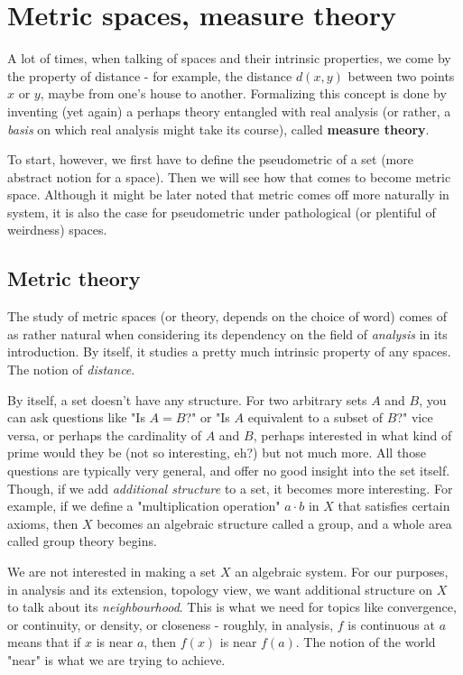 \chapter{Metric spaces, measure theory}

A lot of times, when talking of spaces and their intrinsic properties, we come by the property of distance - for example, the distance $d(x,y)$ between two points $x$ or $y$, maybe from one's house to another. Formalizing this concept is done by inventing (yet again) a perhaps theory entangled with real analysis (or rather, a \textit{basis} on which real analysis might take its course), called \textbf{measure theory}. 

To start, however, we first have to define the pseudometric of a set (more abstract notion for a space). Then we will see how that comes to become metric space. Although it might be later noted that metric comes off more naturally in system, it is also the case for pseudometric under pathological (or plentiful of weirdness) spaces. 

\section{Metric theory}

The study of metric spaces (or theory, depends on the choice of word) comes of as rather natural when considering its dependency on the field of \textit{analysis} in its introduction. By itself, it studies a pretty much intrinsic property of any spaces. The notion of \textit{distance}. 

By itself, a set doesn't have any structure. For two arbitrary sets $A$ and $B$, you can ask questions like "Is $A=B$?" or "Is $A$ equivalent to a subset of $B$?" vice versa, or perhaps the cardinality of $A$ and $B$, perhaps interested in what kind of prime would they be (not so interesting, eh?) but not much more. All those questions are typically very general, and offer no good insight into the set itself. Though, if we add \textit{additional structure} to a set, it becomes more interesting. For example, if we define a "multiplication operation" $a\cdot b$ in $X$ that satisfies certain axioms, then $X$ becomes an algebraic structure called a group, and a whole area called group theory begins. 

We are not interested in making a set $X$ an algebraic system. For our purposes, in analysis and its extension, topology view, we want additional structure on $X$ to talk about its \textit{neighbourhood}. This is what we need for topics like convergence, or continuity, or density, or closeness - roughly, in analysis, $f$ is continuous at $a$ means that if $x$ is near $a$, then $f(x)$ is near $f(a)$. The notion of the world "near" is what we are trying to achieve. 


